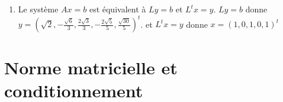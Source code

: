 \documentclass[a4paper]{article}
\begin{document}
\begin{enumerate}
\begin{enumerate}
\[\begin{array}{cl}
\end{array}\right.
\]

En déduire la matrice de Choleski de la matrice 



\[L=\left(\begin{array}{ccccc}
\sqrt 2& 0& 0& 0& 0\\
-\frac{\sqrt 2}2& \frac{\sqrt 6}2& 0& 0& 0\\
0& -\frac{\sqrt 6}3& \frac{2\sqrt 3}3& 0& 0\\
0& 0& -\frac{\sqrt 3}2& \frac{\sqrt 5}2& 0\\
0& 0& 0& -\frac{2\sqrt 5}5& \frac{\sqrt{30}}5
\end{array}\right)
\]
\item Le système $Ax=b$ est équivalent à $Ly=b$ et $L^tx=y$.
$Ly=b$ donne $y=(\sqrt 2, -\frac{\sqrt 6}3, \frac{2\sqrt 3}3, -\frac{2\sqrt 5}5, \frac{\sqrt{30}}5)^t$.
et $L^tx=y$ donne $x=(1,0,1,0,1)^t$


\end{enumerate}

\end{enumerate}


\section{Norme matricielle et conditionnement}
\end{document}
